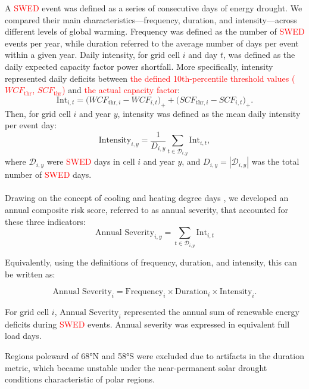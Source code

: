 \documentclass[pdflatex,sn-mathphys-num]{sn-jnl}%
\begin{document}
A \textcolor{red}{SWED} event was defined as a series of consecutive days of energy drought. 
We compared their main characteristics—frequency, duration, and intensity—across different levels of global warming.
Frequency was defined as the number of \textcolor{red}{SWED} events per year, while duration referred to the average number of days per event within a given year. 
Daily intensity, for grid cell $i$ and day $t$, was defined as the daily expected capacity factor power shortfall. More specifically, intensity represented daily deficits between \textcolor{red}{the defined 10th-percentile threshold values ($WCF_{\mathrm{thr}}$, $SCF_{\mathrm{thr}}$)} and \textcolor{red}{the actual capacity factor}:
\begin{equation}
\mathrm{Int}_{i,t} = \bigl(WCF_{\mathrm{thr},i}-WCF_{i,t}\bigr)_{+}
+ \bigl(SCF_{\mathrm{thr},i}-SCF_{i,t}\bigr)_{+}.
\end{equation}
Then, for grid cell $i$ and year $y$, intensity was defined as the mean daily intensity per event day:
\begin{equation}
\text{Intensity}_{i,y}=\frac{1}{D_{i,y}}\sum_{t\in \mathcal{D}_{i,y}}\mathrm{Int}_{i,t},
\end{equation}
where $\mathcal{D}_{i,y}$ were \textcolor{red}{SWED} days in cell $i$ and year $y$, and $D_{i,y}=|\mathcal{D}_{i,y}|$ was the total number of \textcolor{red}{SWED} days.\\
\\
\noindent Drawing on the concept of cooling and heating degree days \cite{mirandaChangeCoolingDegree2023}, we developed an annual composite risk score, referred to as annual severity, that accounted for these three indicators:
\begin{equation}
\text{Annual Severity}_{i,y}
= \sum_{t \in \mathcal{D}_{i,y}} \mathrm{Int}_{i,t}
\end{equation}

Equivalently, using the definitions of frequency, duration, and intensity, this can be written as:

\begin{equation}
\text{Annual Severity}_i=\text{Frequency}_i\times\text{Duration}_i\times\text{Intensity}_i.
\end{equation}

For grid cell $i$, $\text{Annual Severity}_i$ represented the annual sum of renewable energy deficits during \textcolor{red}{SWED} events. Annual severity was expressed in equivalent full load days. 

Regions poleward of 68°N and 58°S were excluded due to artifacts in the duration metric, which became unstable under the near-permanent solar drought conditions characteristic of polar regions.
\end{document}
